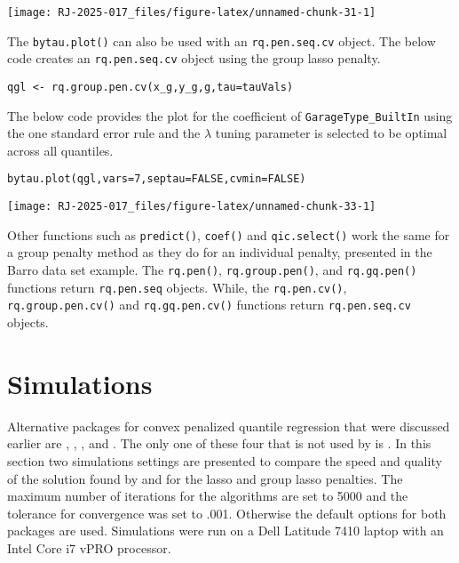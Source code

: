 \begin{center}\texttt{[image: RJ-2025-017\_files/figure-latex/unnamed-chunk-31-1]} \end{center}

The \texttt{bytau.plot()} can also be used with an \texttt{rq.pen.seq.cv} object. The below code creates an \texttt{rq.pen.seq.cv} object using the group lasso penalty.

\begin{verbatim}
qgl <- rq.group.pen.cv(x_g,y_g,g,tau=tauVals)
\end{verbatim}

The below code provides the plot for the coefficient of \texttt{GarageType\_BuiltIn} using the one standard error rule and the \(\lambda\) tuning parameter is selected to be optimal across all quantiles.

\begin{verbatim}
bytau.plot(qgl,vars=7,septau=FALSE,cvmin=FALSE)
\end{verbatim}

\begin{center}\texttt{[image: RJ-2025-017\_files/figure-latex/unnamed-chunk-33-1]} \end{center}

Other functions such as \texttt{predict()}, \texttt{coef()} and \texttt{qic.select()} work the same for a group penalty method as they do for an individual penalty, presented in the Barro data set example. The \texttt{rq.pen()}, \texttt{rq.group.pen()}, and \texttt{rq.gq.pen()} functions return \texttt{rq.pen.seq} objects. While, the \texttt{rq.pen.cv()}, \texttt{rq.group.pen.cv()} and \texttt{rq.gq.pen.cv()} functions return \texttt{rq.pen.seq.cv} objects.

\section{Simulations}\label{simulations}

Alternative packages for convex penalized quantile regression that were discussed earlier are , , , and . The only one of these four that is not used by  is . In this section two simulations settings are presented to compare the speed and quality of the solution found by  and  for the lasso and group lasso penalties. The maximum number of iterations for the algorithms are set to 5000 and the tolerance for convergence was set to .001. Otherwise the default options for both packages are used. Simulations were run on a Dell Latitude 7410 laptop with an Intel Core i7 vPRO processor.

